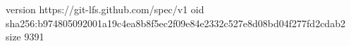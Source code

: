 version https://git-lfs.github.com/spec/v1
oid sha256:b974805092001a19c4ea8b8f5ec2f09e84e2332c527e8d08bd04f277fd2cdab2
size 9391

